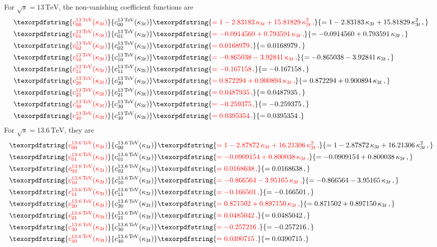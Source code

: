 \documentclass{SciPost}
\providecommand{\DIFaddtex}[1]{{\protect\color{red} #1}} %
\providecommand{\DIFadd}[1]{\texorpdfstring{\DIFaddtex{#1}}{#1}} %
\begin{document}
\DIFadd{For $\sqrt{s}=13\,\mathrm{TeV}$, the non-vanishing coefficient functions are
}\begin{align}
\DIFadd{c_{00}^{13\,\mathrm{TeV}}(\kappa_{3t}) }&\DIFadd{= 1-2.83183\,\kappa_{3t}+15.81829\,\kappa_{3t}^{2}\,, }\\
\DIFadd{c_{01}^{13\,\mathrm{TeV}}(\kappa_{3t}) }&\DIFadd{= -0.0914560+0.793591\,\kappa_{3t}\,, }\\
\DIFadd{c_{02}^{13\,\mathrm{TeV}}(\kappa_{3t}) }&\DIFadd{= 0.0168979\,, }\\
\DIFadd{c_{10}^{13\,\mathrm{TeV}}(\kappa_{3t}) }&\DIFadd{= -0.865038-3.92841\,\kappa_{3t}\,, }\\
\DIFadd{c_{11}^{13\,\mathrm{TeV}}(\kappa_{3t}) }&\DIFadd{= -0.167158\,, }\\
\DIFadd{c_{20}^{13\,\mathrm{TeV}}(\kappa_{3t}) }&\DIFadd{= 0.872294+0.900894\,\kappa_{3t}\,, }\\
\DIFadd{c_{21}^{13\,\mathrm{TeV}}(\kappa_{3t}) }&\DIFadd{= 0.0487935\,, }\\
\DIFadd{c_{30}^{13\,\mathrm{TeV}}(\kappa_{3t}) }&\DIFadd{= -0.259375\,, }\\
\DIFadd{c_{40}^{13\,\mathrm{TeV}}(\kappa_{3t}) }&\DIFadd{= 0.0395354\,.
}\end{align}
\DIFadd{For $\sqrt{s}=13.6\,\mathrm{TeV}$, they are
}\begin{align}
\DIFadd{c_{00}^{13.6\,\mathrm{TeV}}(\kappa_{3t}) }&\DIFadd{= 1-2.87872\,\kappa_{3t}+16.21306\,\kappa_{3t}^{2}\,, }\\
\DIFadd{c_{01}^{13.6\,\mathrm{TeV}}(\kappa_{3t}) }&\DIFadd{= -0.0909154+0.800038\,\kappa_{3t}\,, }\\
\DIFadd{c_{02}^{13.6\,\mathrm{TeV}}(\kappa_{3t}) }&\DIFadd{= 0.0168638\,, }\\
\DIFadd{c_{10}^{13.6\,\mathrm{TeV}}(\kappa_{3t}) }&\DIFadd{= -0.866564-3.95165\,\kappa_{3t}\,, }\\
\DIFadd{c_{11}^{13.6\,\mathrm{TeV}}(\kappa_{3t}) }&\DIFadd{= -0.166501\,, }\\
\DIFadd{c_{20}^{13.6\,\mathrm{TeV}}(\kappa_{3t}) }&\DIFadd{= 0.871502+0.897150\,\kappa_{3t}\,, }\\
\DIFadd{c_{21}^{13.6\,\mathrm{TeV}}(\kappa_{3t}) }&\DIFadd{= 0.0485042\,, }\\
\DIFadd{c_{30}^{13.6\,\mathrm{TeV}}(\kappa_{3t}) }&\DIFadd{= -0.257216\,, }\\
\DIFadd{c_{40}^{13.6\,\mathrm{TeV}}(\kappa_{3t}) }&\DIFadd{= 0.0390715\,.
}\end{align}
\end{document}
